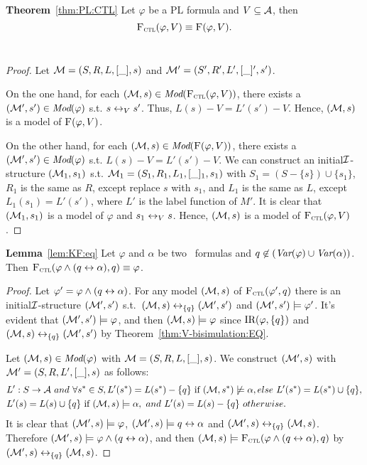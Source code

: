 \documentclass[twoside,11pt]{article}
\begin{document}
	
	
	
	
	
	\noindent\textbf{Theorem}~\ref{thm:PL:CTL}
	Let $\varphi$ be a PL formula and $V\subseteq {\cal A}$, then
	\[
	{\textsc{F}_{\textsc{ctl}}}(\varphi, V) \equiv \textsc{F}(\varphi, V).
	\]
	\\
	\begin{proof}
		Let ${\cal M} = (S, R, L,[\_], s)$ and ${\cal M}' = (S', R', L',[\_]', s')$.
		
		On the one hand, for each $({\cal M}, s) \in \textit{Mod}({\textsc{F}_{\textsc{ctl}}}(\varphi, V))$, there exists a $({\cal M}', s') \in \textit{Mod}(\varphi)$ s.t. $s\leftrightarrow_V s'$. Thus, $L(s)-V = L'(s')-V$. Hence, $({\cal M}, s)$ is a model of $\textsc{F}(\varphi, V)$.
		
		On the other hand, for each $({\cal M}, s) \in \textit{Mod}(\textsc{F}(\varphi, V))$, there exists a $({\cal M}', s') \in \textit{Mod}(\varphi)$ s.t. $L(s)-V = L'(s')-V$. We can construct an initial${\cal I}$-structure $({\cal M}_1, s_1)$ s.t. ${\cal M}_1=(S_1, R_1, L_1,[\_]_1, s_1)$ with $S_1= (S - \{s\}) \cup \{s_1\}$, $R_1$ is the same as $R$, except replace $s$ with $s_1$, and $L_1$ is the same as $L$, except $L_1(s_1) = L'(s')$, where $L'$ is the label function of $M'$. It is clear that $({\cal M}_1, s_1)$ is a model of $\varphi$ and $s_1 \leftrightarrow_V s$. Hence, $({\cal M}, s)$ is a model of ${\textsc{F}_{\textsc{ctl}}}(\varphi, V)$.
	\end{proof}
	
	
	
	
	\noindent \textbf{Lemma}~\ref{lem:KF:eq} Let $\varphi$ and $\alpha$ be two \CTL\ formulas and $q\not \in
	(\textit{Var}(\varphi) \cup \textit{Var}(\alpha))$. Then
	${\textsc{F}_{\textsc{ctl}}}(\varphi \wedge (q\leftrightarrow\alpha), q)\equiv \varphi$.\\
	\begin{proof}
		Let $\varphi' =\varphi \wedge (q\leftrightarrow\alpha)$. For any model $({\cal M},s)$ of ${\textsc{F}_{\textsc{ctl}}}(\varphi', q)$ there is an initial${\cal I}$-structure $({\cal M}',s')$ s.t.\ $({\cal M},s)\leftrightarrow_{\{q\}}({\cal M}',s')$ and $({\cal M}',s') \models \varphi'$. It's evident that $({\cal M}',s') \models \varphi$, and then $({\cal M},s) \models \varphi$ since $\textrm{IR}(\varphi,\{q\})$ and $({\cal M},s)\leftrightarrow_{\{q\}}({\cal M}',s')$
		by Theorem~\ref{thm:V-bisimulation:EQ}.
		
		Let $({\cal M},s) \in \textit{Mod}(\varphi)$ with ${\cal M}=(S, R, L,[\_], s)$. We construct $({\cal M}', s)$ with ${\cal M}' = (S, R, L',[\_], s)$ as follows:
		\begin{align*}
			& L':S \rightarrow {\cal A}\ and\ \forall s^*\in S, L'(s^*) = L(s^*)-\{q\}\ \hbox{if}\ ({\cal M}, s^*) \not \models \alpha, else\ L'(s^*) = L(s^*)\cup\{q\}, \\
			& L'(s) = L(s) \cup\{q\}\ \hbox{if}\ ({\cal M}, s) \models \alpha,\ and\ L'(s) = L(s)-\{q\}\ otherwise.
		\end{align*}
		It is clear that $({\cal M}',s) \models \varphi$, $({\cal M}',s) \models q\leftrightarrow \alpha$ and
		$({\cal M}', s) \leftrightarrow_{\{q\}} ({\cal M}, s)$. Therefore $({\cal M}', s) \models \varphi \wedge (q\leftrightarrow\alpha)$, and then $({\cal M}, s) \models {\textsc{F}_{\textsc{ctl}}} (\varphi \wedge (q\leftrightarrow\alpha), q)$ by
		$({\cal M}', s) \leftrightarrow_{\{q\}} ({\cal M}, s)$.
	\end{proof}
	
\end{document}
